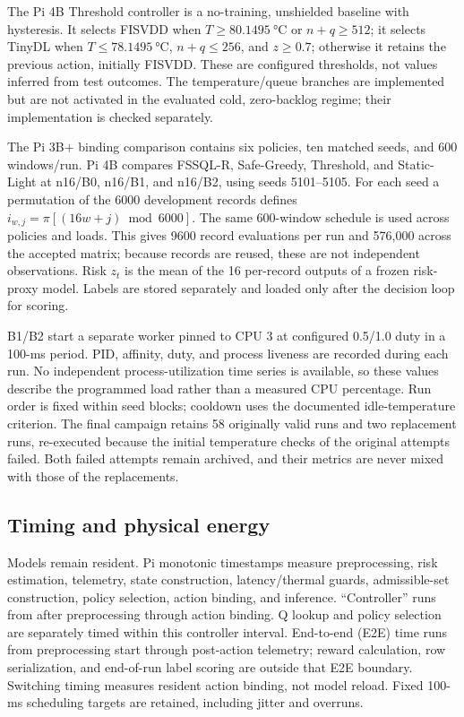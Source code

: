 \documentclass[journal]{IEEEtran}
\begin{document}
The Pi 4B Threshold controller is a no-training, unshielded baseline with hysteresis. It selects FISVDD when $T\ge\SI{80.1495}{\celsius}$ or $n+q\ge512$; it selects TinyDL when $T\le\SI{78.1495}{\celsius}$, $n+q\le256$, and $z\ge0.7$; otherwise it retains the previous action, initially FISVDD. These are configured thresholds, not values inferred from test outcomes. The temperature/queue branches are implemented but are not activated in the evaluated cold, zero-backlog regime; their implementation is checked separately.

The Pi 3B+ binding comparison contains six policies, ten matched seeds, and 600 windows/run. Pi 4B compares FSSQL-R, Safe-Greedy, Threshold, and Static-Light at n16/B0, n16/B1, and n16/B2, using seeds 5101--5105. For each seed a permutation of the 6000 development records defines $i_{w,j}=\pi[(16w+j)\bmod6000]$. The same 600-window schedule is used across policies and loads. This gives 9600 record evaluations per run and 576,000 across the accepted matrix; because records are reused, these are not independent observations. Risk $z_t$ is the mean of the 16 per-record outputs of a frozen risk-proxy model. Labels are stored separately and loaded only after the decision loop for scoring.

B1/B2 start a separate worker pinned to CPU 3 at configured 0.5/1.0 duty in a 100-ms period. PID, affinity, duty, and process liveness are recorded during each run. No independent process-utilization time series is available, so these values describe the programmed load rather than a measured CPU percentage. Run order is fixed within seed blocks; cooldown uses the documented idle-temperature criterion. The final campaign retains 58 originally valid runs and two replacement runs, re-executed because the initial temperature checks of the original attempts failed. Both failed attempts remain archived, and their metrics are never mixed with those of the replacements.

\subsection{Timing and physical energy}
Models remain resident. Pi monotonic timestamps measure preprocessing, risk estimation, telemetry, state construction, latency/thermal guards, admissible-set construction, policy selection, action binding, and inference. ``Controller'' runs from after preprocessing through action binding. Q lookup and policy selection are separately timed within this controller interval. End-to-end (E2E) time runs from preprocessing start through post-action telemetry; reward calculation, row serialization, and end-of-run label scoring are outside that E2E boundary. Switching timing measures resident action binding, not model reload. Fixed 100-ms scheduling targets are retained, including jitter and overruns.
\end{document}
